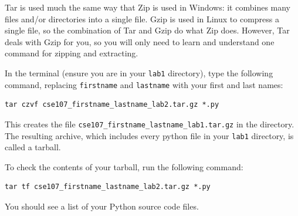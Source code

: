 \documentclass[11pt]{cselabheader}
\begin{document}
Tar is used much the same way that Zip is used in Windows: it combines many files and/or directories into a single file. Gzip is used in Linux to compress a single file, so the combination of Tar and Gzip do what Zip does. However, Tar deals with Gzip for you, so you will only need to learn and understand one command for zipping and extracting.

In the terminal (ensure you are in your \texttt{lab1} directory), type the following command, replacing \texttt{firstname} and \texttt{lastname} with your first and last names:

\begin{lstlisting}[style=bash]
tar czvf cse107_firstname_lastname_lab2.tar.gz *.py
\end{lstlisting}

This creates the file \texttt{cse107\_firstname\_lastname\_lab1.tar.gz} in the directory. The resulting archive, which includes every python file in your \texttt{lab1} directory, is called a tarball. 

To check the contents of your tarball, run the following command:

\begin{lstlisting}[style=bash]
tar tf cse107_firstname_lastname_lab2.tar.gz *.py
\end{lstlisting}

You should see a list of your Python source code files.
\end{document}
